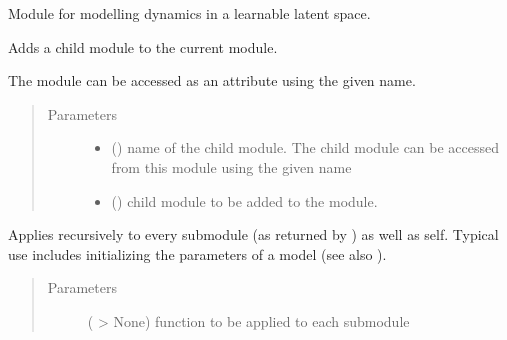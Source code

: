 \documentclass[letterpaper,10pt,english]{sphinxmanual}
\begin{document}
\begin{fulllineitems}
\label{\detokenize{api/dynamics:geology.metamodelling.dynamics.LatentSpaceDynamics}}
Module for modelling dynamics in a learnable latent space.

\begin{fulllineitems}
\label{\detokenize{api/dynamics:geology.metamodelling.dynamics.LatentSpaceDynamics.add_module}}
Adds a child module to the current module.

The module can be accessed as an attribute using the given name.
\begin{quote}\begin{description}
\item[{Parameters}] \leavevmode\begin{itemize}
\item {} 
 () \textendash{} name of the child module. The child module can be
accessed from this module using the given name

\item {} 
 () \textendash{} child module to be added to the module.

\end{itemize}

\end{description}\end{quote}

\end{fulllineitems}


\begin{fulllineitems}
\label{\detokenize{api/dynamics:geology.metamodelling.dynamics.LatentSpaceDynamics.apply}}
Applies  recursively to every submodule (as returned by )
as well as self. Typical use includes initializing the parameters of a model
(see also ).
\begin{quote}\begin{description}
\item[{Parameters}] \leavevmode
{} ( \sphinxhyphen{}\textgreater{} None) \textendash{} function to be applied to each submodule


\end{description}
\end{quote}
\end{fulllineitems}
\end{fulllineitems}
\end{document}
